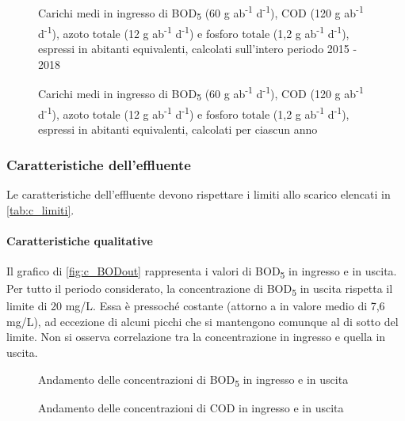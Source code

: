\begin{figure}[H]
		\centering
	\caption{Carichi medi in ingresso di BOD\textsubscript{5} (60 g ab\textsuperscript{-1} d\textsuperscript{-1}), COD (120 g ab\textsuperscript{-1} d\textsuperscript{-1}), azoto totale (12 g ab\textsuperscript{-1} d\textsuperscript{-1}) e fosforo totale (1,2 g ab\textsuperscript{-1} d\textsuperscript{-1}), espressi in abitanti equivalenti, calcolati sull'intero periodo 2015 - 2018}
	\label{fig:c_AEtot}
\end{figure}
\begin{figure}[H]
		\centering
	\caption{Carichi medi in ingresso di BOD\textsubscript{5} (60 g ab\textsuperscript{-1} d\textsuperscript{-1}), COD (120 g ab\textsuperscript{-1} d\textsuperscript{-1}), azoto totale (12 g ab\textsuperscript{-1} d\textsuperscript{-1}) e fosforo totale (1,2 g ab\textsuperscript{-1} d\textsuperscript{-1}), espressi in abitanti equivalenti, calcolati per ciascun anno}
	\label{fig:c_AEanni}
\end{figure}

\subsubsection{Caratteristiche dell'effluente}

Le caratteristiche dell'effluente devono rispettare i limiti allo scarico elencati in \autoref{tab:c_limiti}.

\paragraph{Caratteristiche qualitative}

Il grafico di \autoref{fig:c_BODout} rappresenta i valori di BOD\textsubscript{5} in ingresso e in uscita.
Per tutto il periodo considerato, la concentrazione di BOD\textsubscript{5} in uscita rispetta il limite di 20 mg/L. Essa è pressoché costante (attorno a in valore medio di 7,6 mg/L), ad eccezione di alcuni picchi che si mantengono comunque al di sotto del limite. 
Non si osserva correlazione tra la concentrazione in ingresso e quella in uscita.
\begin{figure}[H]
		\centering
	\caption{Andamento delle concentrazioni di BOD\textsubscript{5} in ingresso e in uscita}
	\label{fig:c_BODout}
\end{figure}
\begin{figure}[H]
		\centering
	\caption{Andamento delle concentrazioni di COD in ingresso e in uscita}
	\label{fig:c_CODout}
\end{figure}

